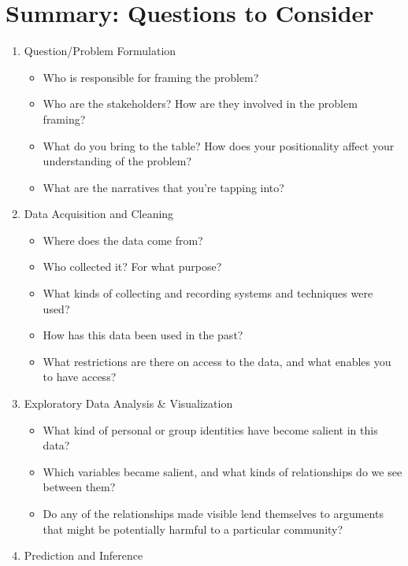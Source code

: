 \documentclass[
  letterpaper,
  DIV=11,
  numbers=noendperiod]{scrreprt}
\providecommand{\tightlist}{%
  \setlength{\itemsep}{0pt}\setlength{\parskip}{0pt}}\usepackage{longtable,booktabs,array}
\begin{document}
\section{Summary: Questions to
Consider}\label{summary-questions-to-consider}

\begin{enumerate}
\def\labelenumi{\arabic{enumi}.}
\item
  Question/Problem Formulation

  \begin{itemize}
  \tightlist
  \item
    Who is responsible for framing the problem?
  \item
    Who are the stakeholders? How are they involved in the problem
    framing?
  \item
    What do you bring to the table? How does your positionality affect
    your understanding of the problem?
  \item
    What are the narratives that you're tapping into?
  \end{itemize}
\item
  Data Acquisition and Cleaning

  \begin{itemize}
  \tightlist
  \item
    Where does the data come from?
  \item
    Who collected it? For what purpose?
  \item
    What kinds of collecting and recording systems and techniques were
    used?
  \item
    How has this data been used in the past?
  \item
    What restrictions are there on access to the data, and what enables
    you to have access?
  \end{itemize}
\item
  Exploratory Data Analysis \& Visualization

  \begin{itemize}
  \tightlist
  \item
    What kind of personal or group identities have become salient in
    this data?
  \item
    Which variables became salient, and what kinds of relationships do
    we see between them?
  \item
    Do any of the relationships made visible lend themselves to
    arguments that might be potentially harmful to a particular
    community?
  \end{itemize}
\item
  Prediction and Inference


\end{enumerate}
\end{document}
